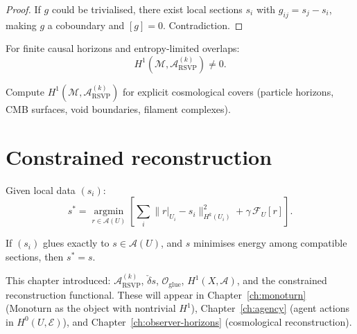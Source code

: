 \begin{proof}
  If $g$ could be trivialised, there exist local sections $s_i$
  with $g_{ij} = s_j - s_i$, making $g$ a coboundary and
  $[g] = 0$.
  Contradiction.
\end{proof}

\begin{conjecture}
  \label{conj:cosmic-obstruction}
  \statusconjectured{}
  For finite causal horizons and entropy-limited overlaps:
  \[
    H^1(\mathcal{M}, \mathcal{A}^{(k)}_{\mathrm{RSVP}}) \neq 0.
  \]
\end{conjecture}

\begin{OpenQuestion}
  Compute $H^1(\mathcal{M}, \mathcal{A}^{(k)}_{\mathrm{RSVP}})$
  for explicit cosmological covers (particle horizons, CMB
  surfaces, void boundaries, filament complexes).
\end{OpenQuestion}

\section{Constrained reconstruction}

\begin{definition}
  \label{def:recon-functional}
  Given local data $(s_i)$:
  \[
    s^* = \operatorname*{argmin}_{r \in \mathcal{A}(U)}
    \left[
      \sum_i \|r|_{U_i} - s_i\|_{H^k(U_i)}^2
      + \gamma\,\mathcal{F}_U[r]
    \right].
  \]
\end{definition}

\begin{proposition}
  \statusproven{}
  If $(s_i)$ glues exactly to $s \in \mathcal{A}(U)$,
  and $s$ minimises energy among compatible sections,
  then $s^* = s$.
\end{proposition}

\begin{MathEcho}
  This chapter introduced:
  $\mathcal{A}^{(k)}_{\mathrm{RSVP}}$,
  $\check{\delta}s$,
  $\mathcal{O}_{\mathrm{glue}}$,
  $H^1(X,\mathcal{A})$,
  and the constrained reconstruction functional.
  These will appear in Chapter~\ref{ch:monoturn} (Monoturn
  as the object with nontrivial $H^1$),
  Chapter~\ref{ch:agency} (agent actions in $H^0(U,\mathcal{E})$),
  and Chapter~\ref{ch:observer-horizons} (cosmological
  reconstruction).
\end{MathEcho}

